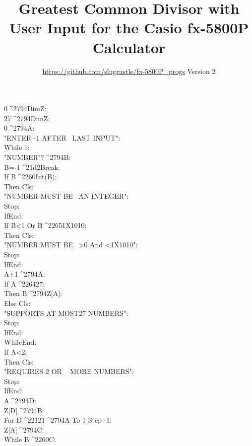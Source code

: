 \documentclass[11pt,letterpaper,twocolumn]{article}
\date{}
\newcommand{\STO}{{\large ^^^^2794}}
\newcommand{\CBR}{{\Large ^^^^21d2}}
\newcommand{\NEQ}{^^^^2260}
\newcommand{\LEQ}{^^^^2264}
\newcommand{\GEQ}{^^^^2265}
\newcommand{\MINUS}{^^^^2212}
\newcommand{\EXPTEN}{{\scriptsize X10}}
\newcommand{\IDENT}[1]{\hspace*{#1\BaseIndent}}
\begin{document}
\title{Greatest Common Divisor with User Input for the Casio fx-5800P Calculator}
\author{\url{https://github.com/slugrustle/fx-5800P_progs} \quad Version 2}
\maketitle
\thispagestyle{fancy}

\begin{linenumbers}
0\STO DimZ:\\
27\STO DimZ:\\
0\STO A:\\
"ENTER -1 AFTER ~LAST INPUT":\\
While 1:\\
\IDENT{1}"NUMBER"?\STO B:\\
\IDENT{1}B=-1\CBR Break:\\
\IDENT{1}If B\NEQ Int(B):\\
\IDENT{2}Then Cls:\\
\IDENT{2}"NUMBER MUST BE ~AN INTEGER":\\
\IDENT{2}Stop:\\
\IDENT{1}IfEnd:\\
\IDENT{1}If B<1 Or B\GEQ 1\EXPTEN 10:\\
\IDENT{2}Then Cls:\\
\IDENT{2}"NUMBER MUST BE ~>0 And <1\EXPTEN 10":\\
\IDENT{2}Stop:\\
\IDENT{1}IfEnd:\\
\IDENT{1}A+1\STO A:\\
\IDENT{1}If A\LEQ 27:\\
\IDENT{2}Then B\STO Z[A]:\\
\IDENT{1}Else Cls:\\
\IDENT{2}"SUPPORTS AT MOST27 NUMBERS":\\
\IDENT{2}Stop:\\
\IDENT{1}IfEnd:\\
WhileEnd:\\
If A<2:\\
\IDENT{1}Then Cls:\\
\IDENT{1}"REQUIRES 2 OR ~ MORE NUMBERS":\\
\IDENT{1}Stop:\\
IfEnd:\\
A\STO D:\\
Z[D]\STO B:\\
For D\MINUS 1\STO A To 1 Step -1:\\
\IDENT{1}Z[A]\STO C:\\
\IDENT{1}While B\NEQ C:\\

\end{linenumbers}
\end{document}
